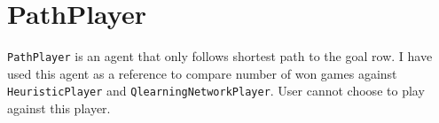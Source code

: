 % 
% 


\section{PathPlayer}
{\lstinline{PathPlayer}} is an agent that only follows shortest path to the
goal row. I have used this agent as a reference to compare number of won games
against {\lstinline{HeuristicPlayer}} and {\lstinline{QlearningNetworkPlayer}}.
User cannot choose to play against this player.

